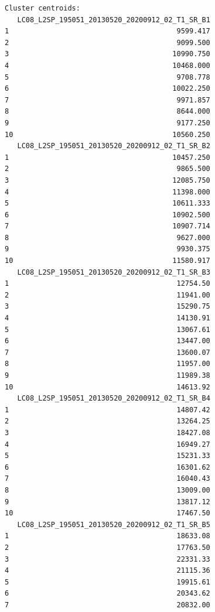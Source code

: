 \documentclass[atmosphere,article,submit,pdftex,moreauthors]{Definitions/mdpi}
\begin{document}
\begin{small}
\begin{verbatim}
Cluster centroids:
   LC08_L2SP_195051_20130520_20200912_02_T1_SR_B1
1                                        9599.417
2                                        9099.500
3                                       10990.750
4                                       10468.000
5                                        9708.778
6                                       10022.250
7                                        9971.857
8                                        8644.000
9                                        9177.250
10                                      10560.250
   LC08_L2SP_195051_20130520_20200912_02_T1_SR_B2
1                                       10457.250
2                                        9865.500
3                                       12085.750
4                                       11398.000
5                                       10611.333
6                                       10902.500
7                                       10907.714
8                                        9627.000
9                                        9930.375
10                                      11580.917
   LC08_L2SP_195051_20130520_20200912_02_T1_SR_B3
1                                        12754.50
2                                        11941.00
3                                        15290.75
4                                        14130.91
5                                        13067.61
6                                        13447.00
7                                        13600.07
8                                        11957.00
9                                        11989.38
10                                       14613.92
   LC08_L2SP_195051_20130520_20200912_02_T1_SR_B4
1                                        14807.42
2                                        13264.25
3                                        18427.08
4                                        16949.27
5                                        15231.33
6                                        16301.62
7                                        16040.43
8                                        13009.00
9                                        13817.12
10                                       17467.50
   LC08_L2SP_195051_20130520_20200912_02_T1_SR_B5
1                                        18633.08
2                                        17763.50
3                                        22331.33
4                                        21115.36
5                                        19915.61
6                                        20343.62
7                                        20832.00

\end{verbatim}
\end{small}
\end{document}
